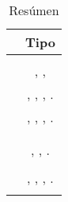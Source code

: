 

\begin{table}[H]
    \centering
\begin{tabular}{ |l|c| }

\hline
	&
	Tipo \frameworkPC%


\\ \hline
	\derbyNAMEref &
	\isomorphicJSFwASref%
	
\\ \hline
	\socketStreamNAMEref &
	\socketStreamNAMEref, \emberjsNAME, \nodejsNAME%
	
\\ \hline
	\meanstackNAMEref &
	\mongodbNAME, \expressjsNAME, \angularjsNAME, \nodejsNAME.%
	
\\ \hline
	\meenstackNAMEref &
	\mongodbNAME, \emberjsNAME, \expressjsNAME, \nodejsNAME.%
 
\\ \hline
	\meteorNAMEref &
	\isomorphicJSFwASref%
	
\\ \hline
	\mojitoNAMEref &
	\isomorphicJSFwASref%
	
\\ \hline
	\saneNAMEref &
	\sailsNAME, \emberjsNAME, \nodejsNAME. %
	
\\ \hline
	\cokeNAMEref &
	
\\ \hline
	\sleekjsNAMEref &
	\handlebarsNAME, \expressjsNAME, \mongooseNAME, \nodejsNAME.%
	
\\ \hline
	\danfNAMEref &

\\ \hline
\end{tabular}
    \caption{Resúmen \fullStackJSFwASref}
    \label{tab:resume_full_stack_javaScript}
\end{table}
